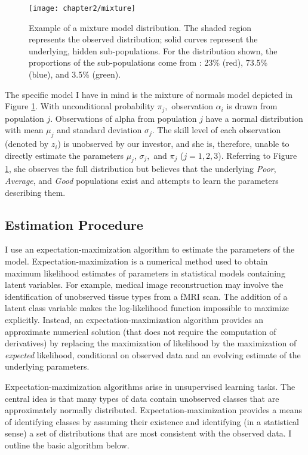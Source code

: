 		\begin{figure}[t]
			\small
			\centering
			\texttt{[image: chapter2/mixture]}
			\captionsetup{skip=-20pt, font=footnotesize, justification=justified, width=\textwidth}
			\caption[Example of a mixture model distribution]{Example of a mixture model distribution. The shaded region represents the observed distribution; solid curves represent the underlying, hidden sub-populations. For the distribution shown, the proportions of the sub-populations come from \citet{Barras2010}: 23\% (red), 73.5\% (blue), and 3.5\% (green).}
			\label{fig:mixture}
		\end{figure}

		The specific model I have in mind is the mixture of normals model depicted in Figure \ref{fig:mixture}. With unconditional probability $\pi_j,$ observation $\alpha_i$ is drawn from population $j$. Observations of alpha from population $j$ have a normal distribution with mean $\mu_j$ and standard deviation $\sigma_j$. The skill level of each observation (denoted by $z_i$) is unobserved by our investor, and she is, therefore, unable to directly estimate the parameters $\mu_j$, $\sigma_j,$ and $\pi_j$ ($j=1,2,3$). Referring to Figure \ref{fig:mixture}, she observes the full distribution but believes that the underlying \textit{Poor}, \textit{Average}, and \textit{Good} populations exist and attempts to learn the parameters describing them.

	\subsection{Estimation Procedure}
		I use an expectation-maximization algorithm to estimate the parameters of the model. Expectation-maximization is a numerical method used to obtain maximum likelihood estimates of parameters in statistical models containing latent variables. For example, medical image reconstruction may involve the identification of unobserved tissue types from a fMRI scan.  The addition of a latent class variable makes the log-likelihood function impossible to maximize explicitly.  Instead, an expectation-maximization algorithm provides an approximate numerical solution (that does not require the computation of derivatives) by replacing the maximization of likelihood by the maximization of \textit{expected} likelihood, conditional on observed data and an evolving estimate of the underlying parameters.

		Expectation-maximization algorithms arise in unsupervised learning tasks.  The central idea is that many types of data contain unobserved classes that are approximately normally distributed.  Expectation-maximization provides a means of identifying classes by assuming their existence and identifying (in a statistical sense) a set of distributions that are most consistent with the observed data. I outline the basic algorithm below.

